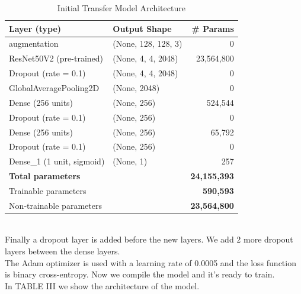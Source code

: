 \documentclass[conference]{IEEEtran}
\begin{document}
\begin{table}[htbp]
	\caption{Initial Transfer Model Architecture}
	\label{table:transfer_cnn_overview}
	\centering
	\begin{adjustbox}{width=0.48\textwidth}
		\begin{tabular}{|l|l|r|}
			\hline
			\textbf{Layer (type)} & \textbf{Output Shape} & \textbf{\# Params} \\
			\hline
			augmentation                   & (None, 128, 128, 3)    &      0  \\
			ResNet50V2 (pre-trained)       & (None, 4, 4, 2048)     & 23,564,800\\
			Dropout (rate = 0.1)           & (None, 4, 4, 2048)     &      0  \\
			GlobalAveragePooling2D         & (None, 2048)           &      0  \\
			Dense (256 units)              & (None, 256)            & 524,544\\
			Dropout (rate = 0.1)           & (None, 256)            &      0  \\
			Dense (256 units)              & (None, 256)            & 65,792\\
			Dropout (rate = 0.1)           & (None, 256)            &      0  \\
			Dense\_1 (1 unit, sigmoid)     & (None, 1)              &     257 \\
			\hline
			\multicolumn{2}{|l|}{\textbf{Total parameters}} & \textbf{24,155,393} \\
			\multicolumn{2}{|l|}{Trainable parameters}       & \textbf{590,593} \\
			\multicolumn{2}{|l|}{Non‑trainable parameters}   & \textbf{23,564,800}\\
			\hline
		\end{tabular}
	\end{adjustbox}
\end{table} \\



Finally a dropout layer is added before the new layers. We add 2 more dropout layers between the dense layers.\\
The Adam optimizer is used with a learning rate of 0.0005 and the loss function is binary cross-entropy.
Now we compile the model and it's ready to train.\\
In TABLE III we show the architecture of the model.\\
\end{document}
